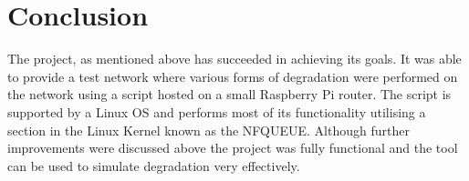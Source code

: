 \chapter{Conclusion}

The project, as mentioned above has succeeded in achieving its goals. It was able to provide a test network where various forms of degradation were performed on the network using a script hosted on a small Raspberry Pi router. The script is supported by a Linux OS and performs most of its functionality utilising a section in the Linux Kernel known as the NFQUEUE. Although further improvements were discussed above the project was fully functional and the tool can be used to simulate degradation very effectively.